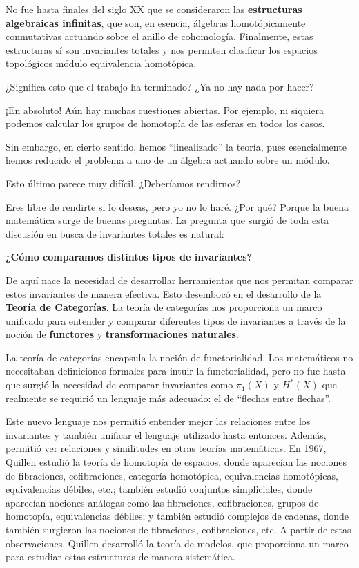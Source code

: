 No fue hasta finales del siglo XX que se consideraron las \textbf{estructuras algebraicas infinitas}, que son, en esencia, álgebras homotópicamente conmutativas actuando sobre el anillo de cohomología. Finalmente, estas estructuras sí son invariantes totales y nos permiten clasificar los espacios topológicos módulo equivalencia homotópica.

\begin{pregunta}
    ¿Significa esto que el trabajo ha terminado? ¿Ya no hay nada por hacer?
\end{pregunta}

¡En absoluto! Aún hay muchas cuestiones abiertas. Por ejemplo, ni siquiera podemos calcular los grupos de homotopía de las esferas en todos los casos.

Sin embargo, en cierto sentido, hemos ``linealizado'' la teoría, pues esencialmente hemos reducido el problema a uno de un álgebra actuando sobre un módulo.

\begin{pregunta}
    Esto último parece muy difícil. ¿Deberíamos rendirnos?
\end{pregunta}

Eres libre de rendirte si lo deseas, pero yo no lo haré. ¿Por qué? Porque la buena matemática surge de buenas preguntas. La pregunta que surgió de toda esta discusión en busca de invariantes totales es natural:

\begin{center}
    \textbf{¿Cómo comparamos distintos tipos de invariantes?}
\end{center}

De aquí nace la necesidad de desarrollar herramientas que nos permitan comparar estos invariantes de manera efectiva. Esto desembocó en el desarrollo de la \textbf{Teoría de Categorías}. La teoría de categorías nos proporciona un marco unificado para entender y comparar diferentes tipos de invariantes a través de la noción de \textbf{functores} y \textbf{transformaciones naturales}.

La teoría de categorías encapsula la noción de functorialidad. Los matemáticos no necesitaban definiciones formales para intuir la functorialidad, pero no fue hasta que surgió la necesidad de comparar invariantes como $\pi_1(X)$ y $H^*(X)$ que realmente se requirió un lenguaje más adecuado: el de ``flechas entre flechas''.

Este nuevo lenguaje nos permitió entender mejor las relaciones entre los invariantes y también unificar el lenguaje utilizado hasta entonces. Además, permitió ver relaciones y similitudes en otras teorías matemáticas. En 1967, Quillen estudió la teoría de homotopía de espacios, donde aparecían las nociones de fibraciones, cofibraciones, categoría homotópica, equivalencias homotópicas, equivalencias débiles, etc.; también estudió conjuntos simpliciales, donde aparecían nociones análogas como las fibraciones, cofibraciones, grupos de homotopía, equivalencias débiles; y también estudió complejos de cadenas, donde también surgieron las nociones de fibraciones, cofibraciones, etc. A partir de estas observaciones, Quillen desarrolló la teoría de modelos, que proporciona un marco para estudiar estas estructuras de manera sistemática.

